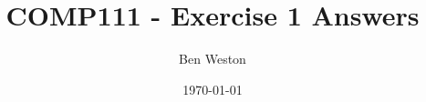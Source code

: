 \documentclass{article}
\title{COMP111 - Exercise 1 Answers}
\author{Ben Weston}
\date{\today}
\begin{document}
\maketitle
\begin{enumerate}
%
%
%
%
%

\end{enumerate}
\end{document}
